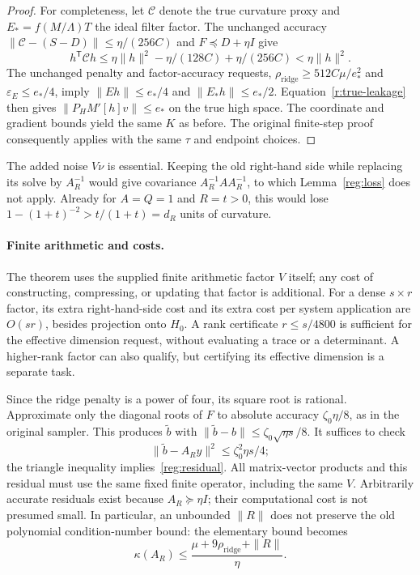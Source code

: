 \documentclass[11pt]{amsart}
\theoremstyle{definition}\newtheorem{definition}[theorem]{Definition}
\theoremstyle{remark}\newtheorem{remark}[theorem]{Remark}
\numberwithin{equation}{section}
\begin{document}
\begin{proof}
For completeness, let $\mathcal C$ denote the true curvature proxy and
$E_*=f(M/\Lambda)T$ the ideal filter factor.  The unchanged accuracy
$\|\mathcal C-(S-D)\|\le\eta/(256C)$ and $F\preceq D+\eta I$ give
\[
 h^{\mathsf T}\mathcal C h
 \le\eta\|h\|^2-\eta/(128C)+\eta/(256C)
 <\eta\|h\|^2.
\]
The unchanged penalty and factor-accuracy requests,
$\rho_{\mathrm{ridge}}\ge512C\mu/e_*^2$ and
$\varepsilon_E\le e_*/4$, imply
$\|Eh\|\le e_*/4$ and $\|E_*h\|\le e_*/2$.
Equation~\eqref{r:true-leakage} then gives
$\|P_HM'[h]v\|\le e_*$ on the true high space.
The coordinate and gradient bounds yield the same $K$ as before.
The original finite-step proof consequently applies with the same
$\tau$ and endpoint choices.
\end{proof}

The added noise $V\nu$ is essential.  Keeping the old right-hand side
while replacing its solve by $A_R^{-1}$ would give covariance
$A_R^{-1}AA_R^{-1}$, to which Lemma~\ref{reg:loss} does not apply.
Already for $A=Q=1$ and $R=t>0$, this would lose
$1-(1+t)^{-2}>t/(1+t)=d_R$ units of curvature.

\paragraph{Finite arithmetic and costs.}
The theorem uses the supplied finite arithmetic factor $V$ itself; any
cost of constructing, compressing, or updating that factor is additional.
For a dense $s\times r$ factor, its extra right-hand-side cost and its
extra cost per system application are $O(sr)$, besides projection onto
$H_0$.  A rank certificate $r\le s/4800$ is sufficient for the effective
dimension request, without evaluating a trace or a determinant.  A
higher-rank factor can also qualify, but certifying its effective
dimension is a separate task.

Since the ridge penalty is a power of four, its square root is rational.
Approximate only the diagonal roots of $F$ to absolute accuracy
$\zeta_0\eta/8$, as in the original sampler.  This produces
$\widetilde b$ with
$\|\widetilde b-b\|\le\zeta_0\sqrt{\eta s}/8$.  It suffices to check
\[
 \|\widetilde b-A_Ry\|^2\le\zeta_0^2\eta s/4;
\]
the triangle inequality implies~\eqref{reg:residual}.  All matrix-vector
products and this residual must use the same fixed finite operator,
including the same $V$.  Arbitrarily accurate residuals exist because
$A_R\succeq\eta I$; their computational cost is not presumed small.
In particular, an unbounded $\|R\|$ does not preserve the old polynomial
condition-number bound: the elementary bound becomes
\[
 \kappa(A_R)\le
 \frac{\mu+9\rho_{\mathrm{ridge}}+\|R\|}{\eta}.
\]
\end{document}
